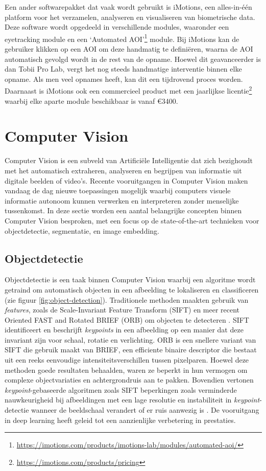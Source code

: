 Een ander softwarepakket dat vaak wordt gebruikt is iMotions, een alles-in-één platform voor het verzamelen, analyseren en visualiseren van biometrische data.
Deze software wordt opgedeeld in verschillende modules, waaronder een eyetracking module en een `Automated AOI'\footnote{\url{https://imotions.com/products/imotions-lab/modules/automated-aoi/}} module.
Bij iMotions kan de gebruiker klikken op een AOI om deze handmatig te definiëren, waarna de AOI automatisch gevolgd wordt in de rest van de opname.
Hoewel dit geavanceerder is dan Tobii Pro Lab, vergt het nog steeds handmatige interventie binnen elke opname. Als men veel opnames heeft, kan dit een tijdrovend proces worden.
Daarnaast is iMotions ook een commercieel product met een jaarlijkse licentie\footnote{\url{https://imotions.com/products/pricing}} waarbij elke aparte module beschikbaar is vanaf €3400.

\section{Computer Vision}

Computer Vision is een subveld van Artificiële Intelligentie dat zich bezighoudt met het automatisch extraheren, analyseren en begrijpen van informatie uit digitale beelden of video's.
Recente vooruitgangen in Computer Vision maken vandaag de dag nieuwe toepassingen mogelijk waarbij computers visuele informatie autonoom kunnen verwerken en interpreteren zonder menselijke tussenkomst.
In deze sectie worden een aantal belangrijke concepten binnen Computer Vision besproken, met een focus op de state-of-the-art technieken voor objectdetectie, segmentatie, en image embedding.

\subsection{Objectdetectie}

Objectdetectie is een taak binnen Computer Vision waarbij een algoritme wordt getraind om automatisch objecten in een afbeelding te lokaliseren en classificeren (zie figuur \ref{fig:object-detection}).
Traditionele methoden maakten gebruik van \textit{features}, zoals de Scale-Invariant Feature Transform (SIFT) en meer recent Oriented FAST and Rotated BRIEF (ORB) om objecten te detecteren \autocite{Lindeberg2012, Rublee2011}.
SIFT identificeert en beschrijft \textit{keypoints} in een afbeelding op een manier dat deze invariant zijn voor schaal, rotatie en verlichting.
ORB is een snellere variant van SIFT die gebruik maakt van BRIEF, een efficiente binaire descriptor die bestaat uit een reeks eenvoudige intensiteitsverschillen tussen pixelparen.
Hoewel deze methoden goede resultaten behaalden, waren ze beperkt in hun vermogen om complexe objectvariaties en achtergrondruis aan te pakken. Bovendien vertonen \textit{keypoint}-gebaseerde algoritmen 
zoals SIFT beperkingen zoals verminderde nauwkeurigheid bij afbeeldingen met een lage resolutie en instabiliteit in \textit{keypoint}-detectie wanneer de beeldschaal verandert of er ruis aanwezig is \autocite{ReyOtero2015}.
De vooruitgang in deep learning heeft geleid tot een aanzienlijke verbetering in prestaties.

